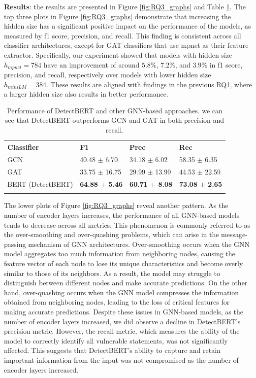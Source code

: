 \documentclass{ieeeaccess}
\begin{document}
\par \textbf{Results}: the results are presented in Figure \ref{fig:RQ3_graphs} and Table \ref{table:RQ3_res}.  The top three plots in Figure \ref{fig:RQ3_graphs} demonstrate that increasing the hidden size has a significant positive impact on the performance of the models, as measured by f1 score, precision, and recall. This finding is consistent across all classifier architectures, except for GAT classifiers that use mpnet as their feature extractor. Specifically, our experiment showed that models with hidden size $h_{mpnet}=784$ have an improvement of around $5.8\%$, $7.2\%$, and $3.9\%$ in f1 score, precision, and recall, respectively over models with lower hidden size $h_{miniLM}=384$. These results are aligned with  findings in the previous RQ1, where  a larger hidden size also results in better performance.
\begin{table}[h]
\centering
\begin{tabular}{llll}
\Xhline{2\arrayrulewidth}
\textbf{Classifier} &\textbf{F1} &\textbf{Prec}&\textbf{Rec}\\
 \hline
\rowcolor{gray!15} 
 GCN & 40.48 $\pm$ 6.70 &34.18 $\pm$ 6.02 &  58.35 $\pm$ 6.35\\
 GAT & 33.75 $\pm$ 16.75  & 29.99 $\pm$ 13.99  & 44.53 $\pm$ 22.59\\
\rowcolor{gray!15} 
 BERT (DetectBERT) & \textbf{64.88 $\pm$ 5.46} & \textbf{60.71 $\pm$ 8.08} &  \textbf{73.08 $\pm$ 2.65}\\
\Xhline{2\arrayrulewidth}
\end{tabular}
\caption{ Performance of DetectBERT and other GNN-based approaches. we can see that DetectBERT outperforms GCN and GAT in both precision and recall.}
\label{table:RQ3_res}
\end{table}
\par The lower plots of Figure \ref{fig:RQ3_graphs} reveal another pattern.  As the number of encoder layers increases, the performance of all GNN-based models tends to decrease across all metrics. This phenomenon is commonly referred to as the over-smoothing\cite{over_smooth} and over-quashing \cite{over_squash} problems, which can arise in the message-passing mechanism of GNN architectures. Over-smoothing occurs when the GNN model aggregates too much information from neighboring nodes, causing the feature vector of each node to lose its unique characteristics and become overly similar to those of its neighbors. As a result, the model may struggle to distinguish between different nodes and make accurate predictions. On the other hand, over-quashing occurs when the GNN model compresses the information obtained from neighboring nodes, leading to the loss of  critical features for making accurate predictions. Despite these issues in GNN-based models, as the number of encoder layers increased, we did observe a  decline in DetectBERT's precision metric. However, the recall metric, which measures the ability of the model to correctly identify all vulnerable statements, was not significantly affected. This suggests that DetectBERT's ability to capture and retain important information from the input was not compromised as the number of encoder layers increased.
\end{document}

